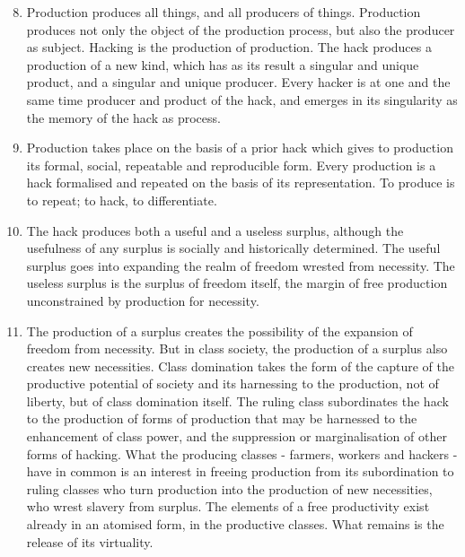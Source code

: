\documentclass[letterpaper,12pt,english]{sphinxmanual}
\begin{document}
\label{wark:production}\begin{enumerate}
\setcounter{enumi}{7}
\item {} 
Production produces all things, and all producers of things. Production produces not only the object of the production process, but also the producer as subject. Hacking is the production of production. The hack produces a production of a new kind, which has as its result a singular and unique product, and a singular and unique producer. Every hacker is at one and the same time producer and product of the hack, and emerges in its singularity as the memory of the hack as process.

\item {} 
Production takes place on the basis of a prior hack which gives to production its formal, social, repeatable and reproducible form. Every production is a hack formalised and repeated on the basis of its representation. To produce is to repeat; to hack, to differentiate.

\item {} 
The hack produces both a useful and a useless surplus, although the usefulness of any surplus is socially and historically determined. The useful surplus goes into expanding the realm of freedom wrested from necessity. The useless surplus is the surplus of freedom itself, the margin of free production unconstrained by production for necessity.

\item {} 
The production of a surplus creates the possibility of the expansion of freedom from necessity. But in class society, the production of a surplus also creates new necessities. Class domination takes the form of the capture of the productive potential of society and its harnessing to the production, not of liberty, but of class domination itself. The ruling class subordinates the hack to the production of forms of production that may be harnessed to the enhancement of class power, and the suppression or marginalisation of other forms of hacking. What the producing classes - farmers, workers and hackers - have in common is an interest in freeing production from its subordination to ruling classes who turn production into the production of new necessities, who wrest slavery from surplus. The elements of a free productivity exist already in an atomised form, in the productive classes. What remains is the release of its virtuality.

\end{enumerate}
\end{document}
